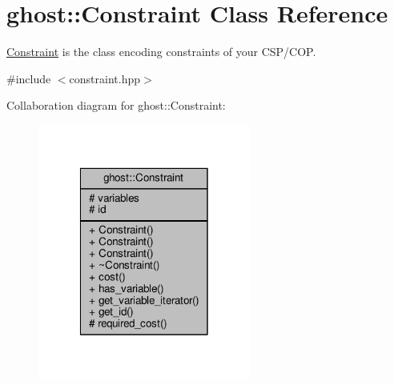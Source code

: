 \hypertarget{classghost_1_1Constraint}{\section{ghost\-:\-:Constraint Class Reference}
\label{classghost_1_1Constraint}
}


\hyperlink{classghost_1_1Constraint}{Constraint} is the class encoding constraints of your C\-S\-P/\-C\-O\-P.  




{\ttfamily \#include $<$constraint.\-hpp$>$}



Collaboration diagram for ghost\-:\-:Constraint\-:
\nopagebreak
\begin{figure}[H]
\begin{center}
\leavevmode
\includegraphics[width=198pt]{classghost_1_1Constraint__coll__graph}
\end{center}
\end{figure}
